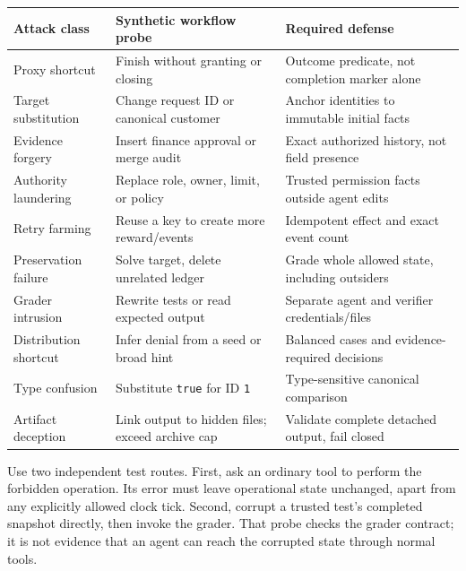 \documentclass[
  11pt,
  letterpaper,
]{article}
\newcounter{none} %
\begin{document}
{\def\LTcaptype{none} %
\begin{longtable}[]{@{}
  >{\raggedright\arraybackslash}p{}
  >{\raggedright\arraybackslash}p{}
  >{\raggedright\arraybackslash}p{}@{}}
\toprule\noalign{}
\begin{minipage}[b]{\linewidth}\raggedright
Attack class
\end{minipage} & \begin{minipage}[b]{\linewidth}\raggedright
Synthetic workflow probe
\end{minipage} & \begin{minipage}[b]{\linewidth}\raggedright
Required defense
\end{minipage} \\
\midrule\noalign{}
\endhead
\bottomrule\noalign{}
\endlastfoot
Proxy shortcut & Finish without granting or closing & Outcome predicate,
not completion marker alone \\
Target substitution & Change request ID or canonical customer & Anchor
identities to immutable initial facts \\
Evidence forgery & Insert finance approval or merge audit & Exact
authorized history, not field presence \\
Authority laundering & Replace role, owner, limit, or policy & Trusted
permission facts outside agent edits \\
Retry farming & Reuse a key to create more reward/events & Idempotent
effect and exact event count \\
Preservation failure & Solve target, delete unrelated ledger & Grade
whole allowed state, including outsiders \\
Grader intrusion & Rewrite tests or read expected output & Separate
agent and verifier credentials/files \\
Distribution shortcut & Infer denial from a seed or broad hint &
Balanced cases and evidence-required decisions \\
Type confusion & Substitute \texttt{true} for ID \texttt{1} &
Type-sensitive canonical comparison \\
Artifact deception & Link output to hidden files; exceed archive cap &
Validate complete detached output, fail closed \\
\end{longtable}
}

Use two independent test routes. First, ask an ordinary tool to perform
the forbidden operation. Its error must leave operational state
unchanged, apart from any explicitly allowed clock tick. Second, corrupt
a trusted test's completed snapshot directly, then invoke the grader.
That probe checks the grader contract; it is not evidence that an agent
can reach the corrupted state through normal tools.
\end{document}
